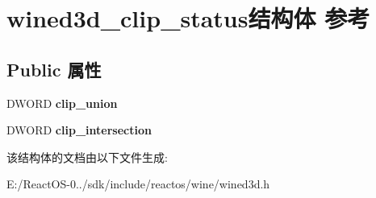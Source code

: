 \hypertarget{structwined3d__clip__status}{}\section{wined3d\+\_\+clip\+\_\+status结构体 参考}
\label{structwined3d__clip__status}
\subsection*{Public 属性}
\begin{DoxyCompactItemize}
\item 
\mbox{\label{structwined3d__clip__status_aa9e6b7a49c94e6329be7373332f86e2f}} 
D\+W\+O\+RD {\bfseries clip\+\_\+union}
\item 
\mbox{\label{structwined3d__clip__status_a9567199ab361c40efd4fcf0cd5ab47f2}} 
D\+W\+O\+RD {\bfseries clip\+\_\+intersection}
\end{DoxyCompactItemize}


该结构体的文档由以下文件生成\+:\begin{DoxyCompactItemize}
\item 
E\+:/\+React\+O\+S-\/0../sdk/include/reactos/wine/wined3d.\+h\end{DoxyCompactItemize}
